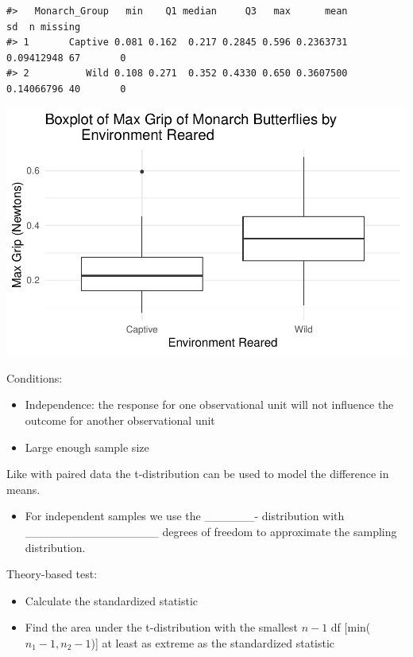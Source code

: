 \documentclass[
]{report}
\providecommand{\tightlist}{%
  \setlength{\itemsep}{0pt}\setlength{\parskip}{0pt}}
\begin{document}
\begin{verbatim}
#>   Monarch_Group   min    Q1 median     Q3   max      mean         sd  n missing
#> 1       Captive 0.081 0.162  0.217 0.2845 0.596 0.2363731 0.09412948 67       0
#> 2          Wild 0.108 0.271  0.352 0.4330 0.650 0.3607500 0.14066796 40       0
\end{verbatim}

\begin{center}\includegraphics[width=0.7\linewidth]{12-VN12-1ofeach_files/figure-latex/unnamed-chunk-6-1} \end{center}

Conditions:

\begin{itemize}
\item
  Independence: the response for one observational unit will not influence the outcome for another observational unit
\item
  Large enough sample size
\end{itemize}

\vspace{1in}

Like with paired data the t-distribution can be used to model the difference in means.


\begin{itemize}
\tightlist
\item
  For independent samples we use the \_\_\_\_\_\_- distribution
  with \_\_\_\_\_\_\_\_\_\_\_\_\_\_\_\_ degrees of freedom to approximate the sampling distribution.
\end{itemize}


Theory-based test:

\begin{itemize}
\item
  Calculate the standardized statistic
\item
  Find the area under the t-distribution with the smallest \(n - 1\) df {[}min(\(n_1-1, n_2-1\)){]} at least as extreme as the standardized statistic
\end{itemize}
\end{document}

